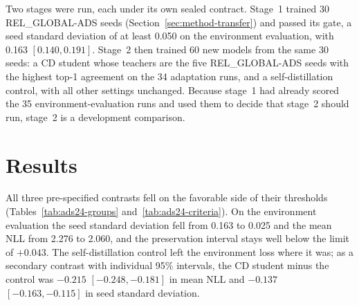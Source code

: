 Two stages were run, each under its own sealed contract. Stage~1
trained 30 REL\_GLOBAL-ADS seeds (Section~\ref{sec:method-transfer})
and passed its gate, a seed standard
deviation of at least 0.050 on the environment evaluation, with 0.163
$[0.140, 0.191]$. Stage~2 then trained 60 new models from the same 30
seeds: a CD student whose teachers are the five REL\_GLOBAL-ADS seeds with
the highest top-1 agreement on the 34 adaptation runs, and a
self-distillation control, with all other settings unchanged. Because
stage~1 had already scored the 35 environment-evaluation runs and used
them to decide that stage~2 should run, stage~2 is a development
comparison.

\section{Results}
\label{sec:ads24-results}

All three pre-specified contrasts fell on the favorable side of their
thresholds (Tables~\ref{tab:ads24-groups} and~\ref{tab:ads24-criteria}). On the
environment evaluation the seed standard deviation fell from 0.163 to
0.025 and the mean NLL from 2.276 to 2.060, and the preservation
interval stays well below the limit of $+0.043$. The self-distillation
control left the environment loss where it was; as a secondary contrast
with individual 95\% intervals, the CD student minus the control was
$-0.215$ $[-0.248, -0.181]$ in mean NLL and $-0.137$
$[-0.163, -0.115]$ in seed standard deviation.

